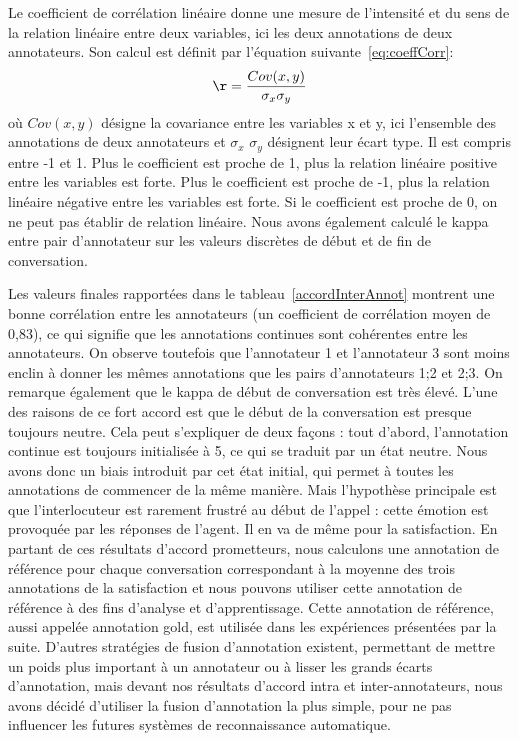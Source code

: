 Le coefficient de corrélation linéaire donne une mesure de l'intensité et du sens de la relation linéaire entre deux variables, ici les deux annotations de deux annotateurs. Son calcul est définit par l'équation suivante~\ref{eq:coeffCorr}:
\begin{equation}
  \r = \dfrac{Cov(x,y)}{\sigma_x \sigma_y}
  \label{eq:coeffCorr}
\end{equation}
où $Cov(x,y)$ désigne la covariance entre les variables x et y, ici l'ensemble des annotations de deux annotateurs et $\sigma_x$ $\sigma_y$ désignent leur écart type.
Il est compris entre -1 et 1. Plus le coefficient est proche de 1, plus la relation linéaire positive entre les variables est forte. Plus le coefficient est proche de -1, plus la relation linéaire négative entre les variables est forte. Si le coefficient est proche de 0, on ne peut pas établir de relation linéaire.
Nous avons également calculé le kappa entre pair d'annotateur sur les valeurs discrètes de début et de fin de conversation.


Les valeurs finales rapportées dans le tableau~\ref{accordInterAnnot} montrent une bonne corrélation entre les annotateurs (un coefficient de corrélation moyen de 0,83), ce qui signifie que les annotations continues sont cohérentes entre les annotateurs.
On observe toutefois que l'annotateur 1 et l'annotateur 3 sont moins enclin à donner les mêmes annotations que les pairs d'annotateurs 1;2 et 2;3. On remarque également que le kappa de début de conversation est très élevé. L’une des raisons de ce fort accord est que le début de la conversation est presque toujours neutre. Cela peut s’expliquer de deux façons : tout d’abord, l’annotation continue est toujours initialisée à 5, ce qui se traduit par un état neutre. Nous avons donc un biais introduit par cet état initial, qui permet à toutes les annotations de commencer de la même manière.
Mais l’hypothèse principale est que l’interlocuteur est rarement frustré au début de l’appel : cette émotion est provoquée par les réponses de l’agent. Il en va de même pour la satisfaction. En partant de ces résultats d’accord prometteurs, nous calculons une annotation de référence pour chaque conversation correspondant à la moyenne des trois annotations de la satisfaction et nous pouvons utiliser cette annotation de référence à des fins d’analyse et d’apprentissage. Cette annotation de référence, aussi appelée annotation gold, est utilisée dans les expériences présentées par la suite.
D'autres stratégies de fusion d'annotation existent, permettant de mettre un poids plus important à un annotateur ou à lisser les grands écarts d'annotation, mais devant nos résultats d'accord intra et inter-annotateurs, nous avons décidé d'utiliser la fusion d'annotation la plus simple, pour ne pas influencer les futures systèmes de reconnaissance automatique.

